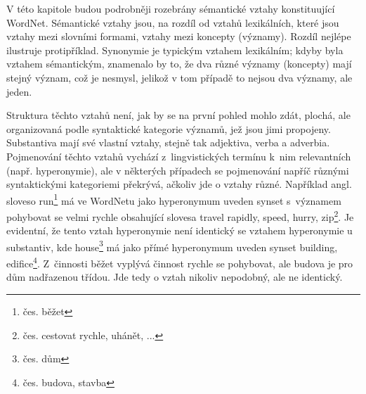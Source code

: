 \documentclass[a4paper, 11pt, oneside, showtrims]{book}
\newcommand{\td}[2][]{
	{\hskip -0.5em\todo[size=\footnotesize]{#2}}
}
\newcommand\ex{\textsf}
\begin{document}







				V této kapitole budou podrobněji rozebrány sémantické vztahy konstituující WordNet. Sémantické vztahy jsou, na rozdíl od vztahů lexikálních, které jsou vztahy mezi slovními formami, vztahy mezi koncepty (významy). Rozdíl nejlépe ilustruje protipříklad. Synonymie je typickým vztahem lexikálním; kdyby byla vztahem sémantickým, znamenalo by to, že dva různé významy (koncepty) mají stejný význam, což je nesmysl, jelikož v tom případě to nejsou dva významy, ale jeden. 

				Struktura těchto vztahů není, jak by se na první pohled mohlo zdát, plochá, ale organizovaná podle syntaktické kategorie významů, jež jsou jimi propojeny. Substantiva mají své vlastní vztahy, stejně tak adjektiva, verba a adverbia. Pojmenování těchto vztahů vychází z~lingvistických termínu k~nim relevantních (např. hyperonymie), ale v některých případech se pojmenování napříč různými syntaktickými kategoriemi překrývá, ačkoliv jde o vztahy různé. Například angl. sloveso \ex{run}\footnote{čes. \ex{běžet}} má ve WordNetu jako hyperonymum uveden synset s~významem \ex{pohybovat se velmi rychle} obsahující slovesa \ex{travel rapidly, speed, hurry, zip}\footnote{čes. \ex{cestovat rychle, uhánět, ...}}. Je evidentní, že tento vztah hyperonymie není identický se vztahem hyperonymie u substantiv, kde \ex{house}\footnote{čes. \ex{dům}} má jako přímé hyperonymum uveden synset \ex{building, edifice}\footnote{čes. \ex{budova, stavba}}. Z~činnosti \ex{běžet} vyplývá činnost \ex{rychle se pohybovat}, ale \ex{budova} je pro \ex{dům} nadřazenou třídou. Jde tedy o vztah nikoliv nepodobný, ale ne identický. \parencite{princetonWN}
\end{document}
